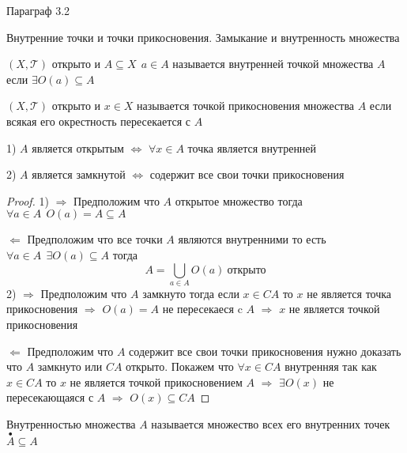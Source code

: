 \begin{title}[\Large]
  Параграф 3.2
\end{title}

\begin{title}[\Large]
  Внутренние точки и точки прикосновения. Замыкание и внутренность множества
\end{title}

\begin{define}
  $(X, \mathcal{T})$ открыто и $A \subseteq X ~~ a \in A$ называется внутренней точкой
  множества $A$ если $\exists O(a) \subseteq A$
\end{define}

\begin{define}
  $(X, \mathcal{T})$ открыто и $x \in X$ называется точкой прикосновения множества $A$
  если всякая его окрестность пересекается с $A$
\end{define}

\begin{theorem}
  1) $A$ является открытым $\Leftrightarrow$ $\forall x \in A$ точка является
  внутренней

  2) $A$ является замкнутой $\Leftrightarrow$ содержит все свои точки
  прикосновения
\end{theorem}

\begin{proof}
  1) $\Rightarrow$ Предположим что $A$ открытое множество тогда $\forall a \in A
  ~~ O(a) = A \subseteq A$

  $\Leftarrow$ Предположим что все точки $A$ являются внутренними то есть
  $\forall a \in A ~~ \exists O(a) \subseteq A$ тогда
  $$
  A = \bigcup_{a \in A} O(a) ~ \text{открыто}
  $$
  2) $\Rightarrow$ Предположим что $A$ замкнуто тогда если $x \in CA$
  то $x$ не является точка прикосновения $\Rightarrow$ $O(a) = A$ не пересекаеся
  c $A$  $\Rightarrow$ $x$ не является точкой прикосновения

  $\Leftarrow$ Предположим что $A$ содержит все свои точки прикосновения нужно
  доказать что $A$ замкнуто или $CA$ открыто. Покажем что $\forall x \in CA$
  внутренняя так как
  $x \in CA$ то $x$ не является точкой прикосновением $A$ $\Rightarrow$
  $\exists O(x)$ не пересекающаяся с $A$ $\Rightarrow$ $O(x) \subseteq CA$
\end{proof}

\begin{define}
  Внутренностью множества $A$ называется множество всех его внутренних точек
  $\stackrel{\bullet}{A} \subseteq A$
\end{define}

